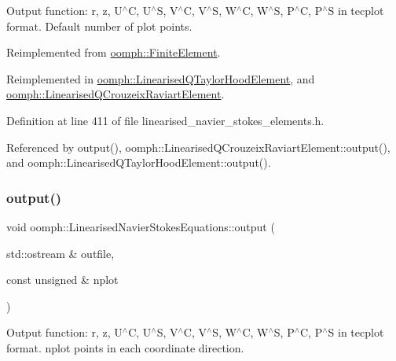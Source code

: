 Output function\+: r, z, U$^\wedge$C, U$^\wedge$S, V$^\wedge$C, V$^\wedge$S, W$^\wedge$C, W$^\wedge$S, P$^\wedge$C, P$^\wedge$S in tecplot format. Default number of plot points. 



Reimplemented from \hyperlink{classoomph_1_1FiniteElement_a2ad98a3d2ef4999f1bef62c0ff13f2a7}{oomph\+::\+Finite\+Element}.



Reimplemented in \hyperlink{classoomph_1_1LinearisedQTaylorHoodElement_a0a51768cb37a15ede6bc402a2c22e718}{oomph\+::\+Linearised\+Q\+Taylor\+Hood\+Element}, and \hyperlink{classoomph_1_1LinearisedQCrouzeixRaviartElement_a160a7f873347a58ca86ee24a68725e27}{oomph\+::\+Linearised\+Q\+Crouzeix\+Raviart\+Element}.



Definition at line 411 of file linearised\+\_\+navier\+\_\+stokes\+\_\+elements.\+h.



Referenced by output(), oomph\+::\+Linearised\+Q\+Crouzeix\+Raviart\+Element\+::output(), and oomph\+::\+Linearised\+Q\+Taylor\+Hood\+Element\+::output().

\mbox{\label{classoomph_1_1LinearisedNavierStokesEquations_a66bb65cc2c52846e76f8d02c1f956215}} 
\subsubsection{\texorpdfstring{output()}{output()}\hspace{0.1cm}{\footnotesize\ttfamily [2/4]}}
{\footnotesize\ttfamily void oomph\+::\+Linearised\+Navier\+Stokes\+Equations\+::output (\begin{DoxyParamCaption}\item[{std\+::ostream \&}]{outfile,  }\item[{const unsigned \&}]{nplot }\end{DoxyParamCaption})\hspace{0.3cm}{\ttfamily [virtual]}}



Output function\+: r, z, U$^\wedge$C, U$^\wedge$S, V$^\wedge$C, V$^\wedge$S, W$^\wedge$C, W$^\wedge$S, P$^\wedge$C, P$^\wedge$S in tecplot format. nplot points in each coordinate direction. 

